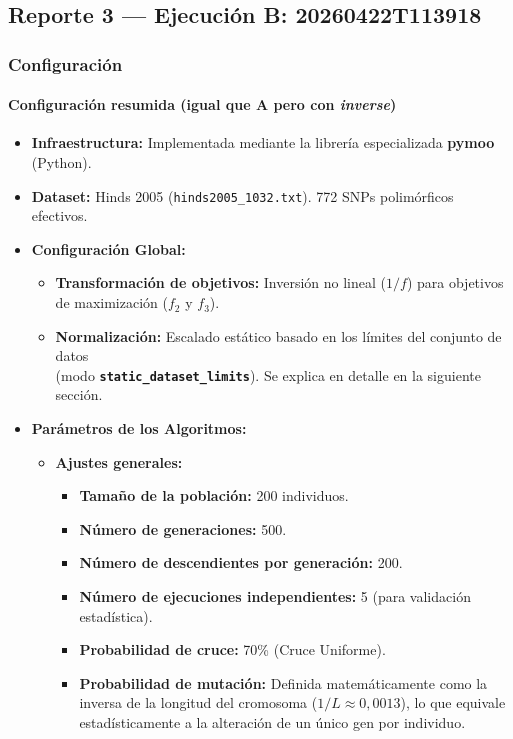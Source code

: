 \documentclass[a4paper,10pt]{article} %
\begin{document}
\subsection{Reporte 3 — Ejecución B: 20260422T113918}
\label{sec:reporte3}

\subsubsection{Configuración}

\paragraph{Configuración resumida (igual que A pero con \textit{inverse})}
\begin{itemize}
    \item \textbf{Infraestructura:} Implementada mediante la librería especializada \textbf{pymoo} (Python).
    \item \textbf{Dataset:} Hinds 2005 (\texttt{hinds2005\_1032.txt}). 772 SNPs polimórficos efectivos.
    \item \textbf{Configuración Global:}
    \begin{itemize}
        \item \textbf{Transformación de objetivos:} Inversión no lineal ($1/f$) para objetivos de maximización ($f_2$ y $f_3$).
        \item \textbf{Normalización:} Escalado estático basado en los límites del conjunto de datos \\ (modo \textbf{\texttt{static\_dataset\_limits}}). Se explica en detalle en la siguiente sección.
    \end{itemize}
    \item \textbf{Parámetros de los Algoritmos:}
    \begin{itemize}
        \item \textbf{Ajustes generales:}
        \begin{itemize}
            \item \textbf{Tamaño de la población:} 200 individuos.
            \item \textbf{Número de generaciones:} 500.
            \item \textbf{Número de descendientes por generación:} 200.
            \item \textbf{Número de ejecuciones independientes:} 5 (para validación estadística).
            \item \textbf{Probabilidad de cruce:} 70\% (Cruce Uniforme).
            \item \textbf{Probabilidad de mutación:} Definida matemáticamente como la inversa de la longitud del cromosoma ($1/L \approx 0,0013$), lo que equivale estadísticamente a la alteración de un único gen por individuo.

\end{itemize}
\end{itemize}
\end{itemize}
\end{document}
